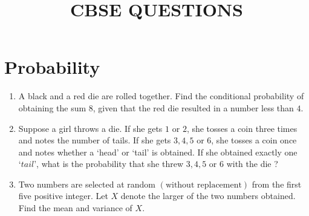 \documentclass{article}
\providecommand{\brak}[1]{\ensuremath{\left(#1\right)}}
\begin{document}
\title{\textbf{CBSE QUESTIONS}}
\date{}
\maketitle{}
\section{Probability}
\begin{enumerate}
\item A black and a red die are rolled together. Find the conditional probability of obtaining the sum $8$, given that the red die resulted in a number less than $4$.
\item Suppose a girl throws a die. If she gets $1$ or $2$, she tosses a coin three times and notes the number of tails. If she gets $3, 4, 5$ or $6$, she tosses a coin once and notes whether a ‘head’ or ‘tail’ is obtained. If she obtained exactly one $‘tail’$, what is the probability that she threw $3, 4, 5$ or $6$ with the die ?
\item Two numbers are selected at random \brak{\text{without replacement}} from the first five positive integer. Let $X$ denote the larger of the two numbers obtained. Find the mean and variance of $X$.
\end{enumerate}
\end{document}
